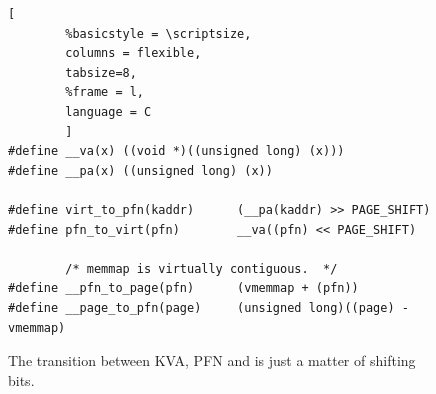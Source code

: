 \begin{figure}[t]
                \begin{lstlisting}[
        %basicstyle = \scriptsize,
        columns = flexible,
        tabsize=8,
        %frame = l,
        language = C
        ]
#define __va(x) ((void *)((unsigned long) (x)))
#define __pa(x) ((unsigned long) (x))

#define virt_to_pfn(kaddr)      (__pa(kaddr) >> PAGE_SHIFT)
#define pfn_to_virt(pfn)        __va((pfn) << PAGE_SHIFT)

        /* memmap is virtually contiguous.  */
#define __pfn_to_page(pfn)      (vmemmap + (pfn))  
#define __page_to_pfn(page)     (unsigned long)((page) - vmemmap)
                \end{lstlisting}
        \caption{ The transition between KVA, PFN and \page is just a matter of shifting bits.
                }
        \label{fig:mem_model}
\end{figure}
